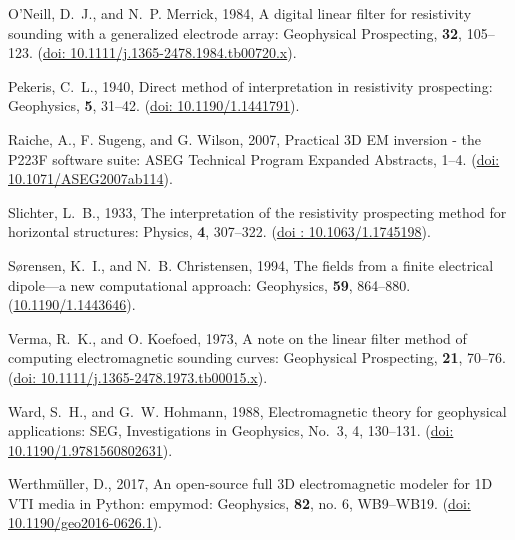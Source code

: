 \documentclass[paper,twocolumn,twoside]{geophysics}
\begin{document}
\begin{thebibliography}{}
O'Neill, D.~J., and N.~P. Merrick,  1984, A digital linear filter for
  resistivity sounding with a generalized electrode array: Geophysical
  Prospecting, {\bf 32}, 105--123.
\newblock (\href{https://doi.org/10.1111/j.1365-2478.1984.tb00720.x}{doi:
  10.1111/j.1365-2478.1984.tb00720.x}).

Pekeris, C.~L.,  1940, Direct method of interpretation in resistivity
  prospecting: Geophysics, {\bf 5}, 31--42.
\newblock (\href{https://doi.org/10.1190/1.1441791}{doi: 10.1190/1.1441791}).

Raiche, A., F. Sugeng, and G. Wilson,  2007, Practical {3D} {EM} inversion -
  the {P223F} software suite: ASEG Technical Program Expanded Abstracts,  1--4.
\newblock (\href{https://doi.org/10.1071/ASEG2007ab114}{doi:
  10.1071/ASEG2007ab114}).

Slichter, L.~B.,  1933, The interpretation of the resistivity prospecting
  method for horizontal structures: Physics, {\bf 4}, 307--322.
\newblock (\href{https://doi.org/10.1063/1.1745198}{doi : 10.1063/1.1745198}).

Sørensen, K.~I., and N.~B. Christensen,  1994, The fields from a finite
  electrical dipole—a new computational approach: Geophysics, {\bf 59},
  864--880.
\newblock (\href{https://doi.org/10.1190/1.1443646}{10.1190/1.1443646}).

Verma, R.~K., and O. Koefoed,  1973, A note on the linear filter method of
  computing electromagnetic sounding curves: Geophysical Prospecting, {\bf 21},
  70--76.
\newblock (\href{https://doi.org/10.1111/j.1365-2478.1973.tb00015.x}{doi:
  10.1111/j.1365-2478.1973.tb00015.x}).

Ward, S.~H., and G.~W. Hohmann,  1988, Electromagnetic theory for geophysical
applications: SEG, Investigations in Geophysics, No.~3, 4, 130--131.
\newblock  (\href{https://doi.org/10.1190/1.9781560802631}{doi:
  10.1190/1.9781560802631}).

Werthmüller, D., 2017, An open-source full {3D} electromagnetic modeler for
  {1D} {VTI} media in {P}ython: empymod: Geophysics, {\bf 82}, no. 6,
  WB9--WB19.
\newblock (\href{https://doi.org/10.1190/geo2016-0626.1}{doi:
  10.1190/geo2016-0626.1}).

\end{thebibliography}
\end{document}
